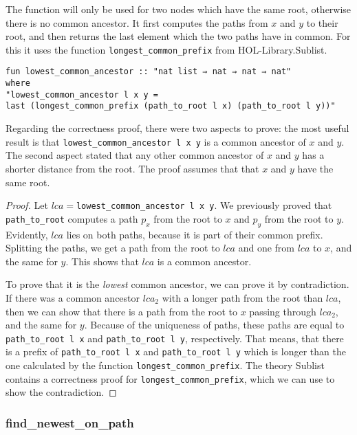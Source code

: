 The function will only be used for two nodes which have the same root, otherwise there is no common ancestor. It first computes the paths from $x$ and $y$ to their root, and then returns the last element which the two paths have in common. For this it uses the function \lstinline{longest_common_prefix} from HOL-Library.Sublist\cite{Sublist}.

\begin{lstlisting}
fun lowest_common_ancestor :: "nat list ⇒ nat ⇒ nat ⇒ nat" 
where
"lowest_common_ancestor l x y = 
last (longest_common_prefix (path_to_root l x) (path_to_root l y))"
\end{lstlisting}

Regarding the correctness proof, there were two aspects to prove: the most useful result is that \lstinline{lowest_common_ancestor l x y} is a common ancestor of $x$ and $y$. The second aspect stated that any other common ancestor of $x$ and $y$ has a shorter distance from the root. The proof assumes that that $x$ and $y$ have the same root.

\begin{proof}
Let $lca =$\lstinline{lowest_common_ancestor l x y}. We previously proved that \lstinline{path_to_root} computes a path $p_x$ from the root to $x$ and $p_y$ from the root to $y$. Evidently, $lca$ lies on both paths, because it is part of their common prefix. Splitting the paths, we get a path from the root to $lca$ and one from $lca$ to $x$, and the same for $y$. This shows that $lca$ is a common ancestor. 

To prove that it is the \emph{lowest} common ancestor, we can prove it by contradiction. If there was a common ancestor $lca_2$ with a longer path from the root than $lca$, then we can show that there is a path from the root to $x$ passing through $lca_2$, and the same for $y$. Because of the uniqueness of paths, these paths are equal to \lstinline{path_to_root l x} and \lstinline{path_to_root l y}, respectively. That means, that there is a prefix of \lstinline{path_to_root l x} and \lstinline{path_to_root l y} which is longer than the one calculated by the function \lstinline{longest_common_prefix}. The theory Sublist\cite{Sublist} contains a correctness proof for \lstinline{longest_common_prefix}, which we can use to show the contradiction.
\end{proof}

\subsubsection{find\_newest\_on\_path}

